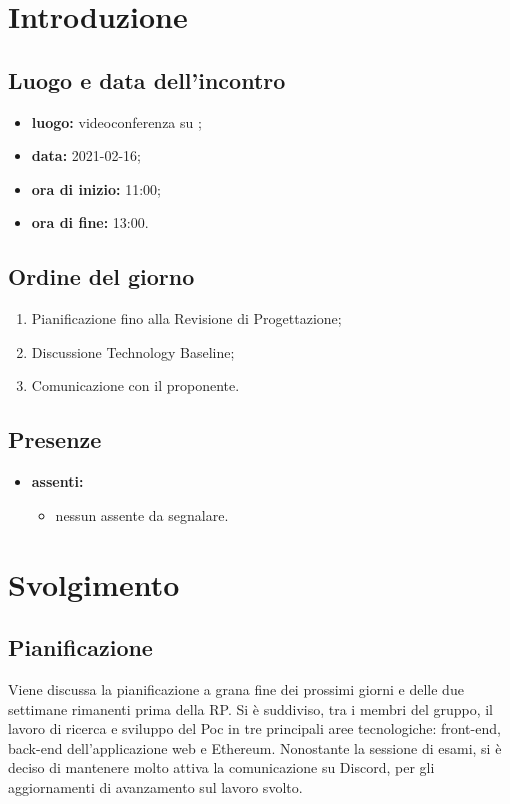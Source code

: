 \section*{Introduzione}
\subsection*{Luogo e data dell'incontro}
\begin{itemize}
\item \textbf{luogo:} videoconferenza su ;
\item \textbf{data:} 2021-02-16;
\item \textbf{ora di inizio:} 11:00;
\item \textbf{ora di fine:} 13:00.
\end{itemize}

\subsection*{Ordine del giorno}
\begin{enumerate}
	\item Pianificazione fino alla Revisione di Progettazione;
	\item Discussione Technology Baseline;
	\item Comunicazione con il proponente.
\end{enumerate}

\subsection*{Presenze}
\begin{itemize}
	\item \textbf{assenti:}
	\begin{itemize}
	\item nessun assente da segnalare.
	\end{itemize}
\end{itemize}

\section*{Svolgimento}
\subsection*{Pianificazione}
Viene discussa la pianificazione a grana fine dei prossimi giorni e delle due settimane rimanenti prima della RP. Si è suddiviso, tra i membri del gruppo, il lavoro di ricerca e sviluppo del Poc in tre principali aree tecnologiche: front-end, back-end dell'applicazione web e Ethereum. 
Nonostante la sessione di esami, si è deciso di mantenere molto attiva la comunicazione su Discord, per gli aggiornamenti di avanzamento sul lavoro svolto.

